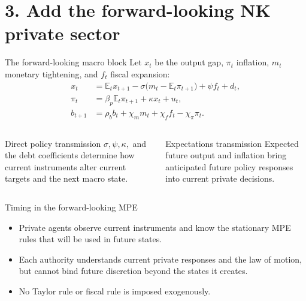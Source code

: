 \documentclass[10pt,aspectratio=169]{beamer}
\newcommand{\E}{\mathbb{E}}
\begin{document}
\section{3. Add the forward-looking NK private sector}

\begin{frame}{The forward-looking macro block}
Let $x_t$ be the output gap, $\pi_t$ inflation, $m_t$ monetary tightening, and
$f_t$ fiscal expansion:
\begin{align*}
x_t&=\E_tx_{t+1}
-\sigma\bigl(m_t-\E_t\pi_{t+1}\bigr)+\psi f_t+d_t,\\
\pi_t&=\beta_p\E_t\pi_{t+1}+\kappa x_t+u_t,\\
b_{t+1}&=\rho_bb_t+\chi_mm_t+\chi_ff_t-\chi_\pi\pi_t.
\end{align*}
\begin{columns}[T,onlytextwidth]
\begin{block}{Direct policy transmission}
$\sigma,\psi,\kappa,$ and the debt coefficients determine how current
instruments alter current targets and the next macro state.
\end{block}
\begin{alertblock}{Expectations transmission}
Expected future output and inflation bring anticipated future policy responses
into current private decisions.
\end{alertblock}
\end{columns}
\end{frame}

\begin{frame}{Timing in the forward-looking MPE}
\centering
{}
\vspace{0.7cm}
\begin{itemize}
  \item Private agents observe current instruments and know the stationary MPE
        rules that will be used in future states.
  \item Each authority understands current private responses and the law of
        motion, but cannot bind future discretion beyond the states it creates.
  \item No Taylor rule or fiscal rule is imposed exogenously.
\end{itemize}
\end{frame}
\end{document}
